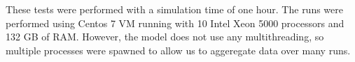 \documentclass{sig-alternate-05-2015}
\begin{document}
			These tests were performed with a simulation time of one hour. The runs were performed using Centos 7 VM running with 10 Intel Xeon 5000 processors and 132 GB of RAM. However, the model does not use any multithreading, so multiple processes were spawned to allow us to aggeregate data over many runs.
			
			
%			
%			
%			
%			
\end{document}
